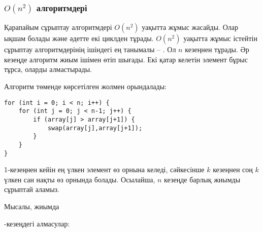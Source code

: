\subsubsection{$O(n^2)$ алгоритмдері}


Қарапайым сұрыптау алгоритмдері $O(n^2)$ 
уақытта жұмыс жасайды.
Олар ықшам болады және әдетте екі циклден тұрады.
$O(n^2)$ уақытта жұмыс істейтін сұрыптау алгоритмдерінің ішіндегі ең танымалы -- .
Ол $n$ кезеңнен тұрады.
Әр кезеңде алгоритм жиым ішімен өтіп шығады.
Екі қатар келетін элемент бұрыс тұрса,
оларды алмастырады.

Алгоритм төменде көрсетілген жолмен орындалады:
\begin{lstlisting}
for (int i = 0; i < n; i++) {
    for (int j = 0; j < n-1; j++) {
        if (array[j] > array[j+1]) {
            swap(array[j],array[j+1]);
        }
    }
}
\end{lstlisting}

1-кезеңнен кейін
ең үлкен элемент өз орнына келеді,
сәйкесінше $k$ кезеңнен соң $k$ үлкен сан 
нақты өз орнында болады.
Осылайша, $n$ кезеңде барлық жиымды сұрыптай аламыз.

Мысалы, жиымда

\begin{center}
\end{center}

-кезеңдегі алмасулар:

\begin{center}
\end{center}

\begin{center}
\end{center}

